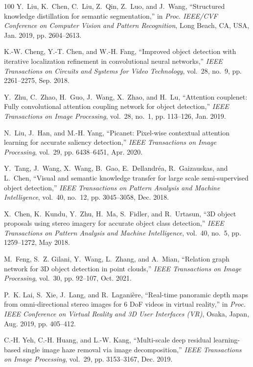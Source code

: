 \documentclass[journal]{IEEEtran}
\begin{document}
\begin{thebibliography}{100}
	Y.~Liu, K.~Chen, C.~Liu, Z.~Qin, Z.~Luo, and J.~Wang, ``Structured knowledge
	distillation for semantic segmentation,'' in \emph{Proc. IEEE/CVF Conference
		on Computer Vision and Pattern Recognition}, Long Beach, CA, USA, Jan. 2019,
	pp. 2604--2613.
	
	K.-W. Cheng, Y.-T. Chen, and W.-H. Fang, ``Improved object detection with
	iterative localization refinement in convolutional neural networks,''
	\emph{IEEE Transactions on Circuits and Systems for Video Technology},
	vol.~28, no.~9, pp. 2261--2275, Sep. 2018.
	
	Y.~Zhu, C.~Zhao, H.~Guo, J.~Wang, X.~Zhao, and H.~Lu, ``Attention couplenet:
	Fully convolutional attention coupling network for object detection,''
	\emph{IEEE Transactions on Image Processing}, vol.~28, no.~1, pp. 113--126,
	Jan. 2019.
	
	N.~Liu, J.~Han, and M.-H. Yang, ``Picanet: Pixel-wise contextual attention
	learning for accurate saliency detection,'' \emph{IEEE Transactions on Image
		Processing}, vol.~29, pp. 6438--6451, Apr. 2020.
	
	Y.~Tang, J.~Wang, X.~Wang, B.~Gao, E.~Dellandréa, R.~Gaizauskas, and L.~Chen,
	``Visual and semantic knowledge transfer for large scale semi-supervised
	object detection,'' \emph{IEEE Transactions on Pattern Analysis and Machine
		Intelligence}, vol.~40, no.~12, pp. 3045--3058, Dec. 2018.
	
	X.~Chen, K.~Kundu, Y.~Zhu, H.~Ma, S.~Fidler, and R.~Urtasun, ``{3D} object
	proposals using stereo imagery for accurate object class detection,''
	\emph{IEEE Transactions on Pattern Analysis and Machine Intelligence},
	vol.~40, no.~5, pp. 1259--1272, May 2018.
	
	M.~Feng, S.~Z. Gilani, Y.~Wang, L.~Zhang, and A.~Mian, ``Relation graph network
	for {3D} object detection in point clouds,'' \emph{IEEE Transactions on Image
		Processing}, vol.~30, pp. 92--107, Oct. 2021.
	
	P.~K. Lai, S.~Xie, J.~Lang, and R.~Lagani{\`e}re, ``Real-time panoramic depth
	maps from omni-directional stereo images for 6 {DoF} videos in virtual
	reality,'' in \emph{Proc. IEEE Conference on Virtual Reality and 3D User
		Interfaces (VR)}, Osaka, Japan, Aug. 2019, pp. 405--412.
	
	C.-H. Yeh, C.-H. Huang, and L.-W. Kang, ``Multi-scale deep residual
	learning-based single image haze removal via image decomposition,''
	\emph{IEEE Transactions on Image Processing}, vol.~29, pp. 3153--3167, Dec.
	2019.
	

\end{thebibliography}
\end{document}
